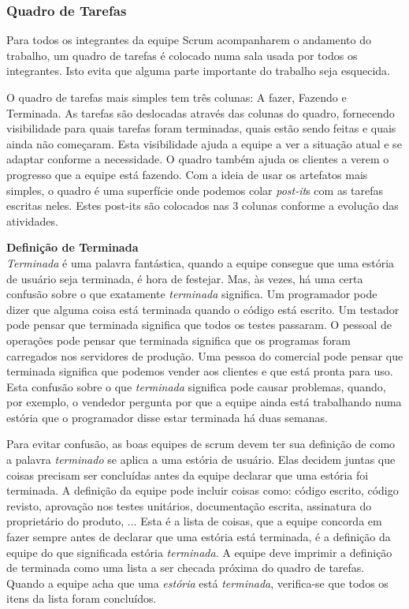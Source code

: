\documentclass[
	11pt,				%
	openright,
	twoside,			%
	a4paper,			%
	english,			%
	french,
	brazil,				%
	sumario=tradicional
	]{abntex2}
\begin{document}
\subsubsection{Quadro de Tarefas}
Para todos os integrantes da equipe Scrum acompanharem o andamento do trabalho, um quadro de tarefas é colocado numa sala usada por todos os integrantes. Isto evita que alguma parte importante do trabalho seja esquecida.

O quadro de tarefas mais simples tem três colunas: A fazer, Fazendo e Terminada. As tarefas são deslocadas através das colunas do quadro, fornecendo visibilidade para quais tarefas foram terminadas, quais estão sendo feitas e quais ainda não começaram. Esta visibilidade ajuda a equipe a ver a situação atual e se adaptar conforme a necessidade. O quadro também ajuda os clientes a verem o progresso que a equipe está fazendo. Com a ideia de usar os artefatos mais simples, o quadro é uma superfície onde podemos colar \textit{post-it}s com as tarefas escritas neles. Estes post-its são colocados nas 3 colunas conforme a evolução das atividades.

\begin{center}
\parbox{16cm}{
\textbf{Definição de Terminada}\\
\textit{Terminada} é uma palavra fantástica, quando a equipe consegue que uma estória de usuário seja terminada, é hora de festejar. Mas, às vezes, há uma certa confusão sobre o que exatamente \emph{terminada} significa. Um programador pode dizer que alguma coisa está terminada quando o código está escrito. Um testador pode pensar que terminada significa que todos os testes passaram. O pessoal de operações pode pensar que terminada significa que os programas foram carregados nos servidores de produção. Uma pessoa do comercial pode pensar que terminada significa que podemos vender aos clientes e que está pronta para uso. Esta confusão sobre o que \emph{terminada} significa pode causar problemas, quando, por exemplo, o vendedor pergunta por que a equipe ainda está trabalhando numa estória que o programador disse estar terminada há duas semanas.

Para evitar confusão, as boas equipes de scrum devem ter sua definição de como a palavra \emph{terminado} se aplica a uma estória de usuário. Elas decidem juntas que coisas precisam ser concluídas antes da equipe declarar que uma estória foi terminada. A definição da equipe pode incluir coisas como: código escrito, código revisto, aprovação nos testes unitários, documentação escrita, assinatura do proprietário do produto, ... Esta é a lista de coisas, que a equipe concorda em fazer sempre antes de declarar que uma estória está terminada, é a definição da equipe do que significada estória \emph{terminada}. A equipe deve imprimir a definição de terminada como uma lista a ser checada próxima do quadro de tarefas. Quando a equipe acha que uma \emph{estória} está \emph{terminada}, verifica-se que todos os itens da lista foram concluídos.
}

\end{center}
\end{document}
